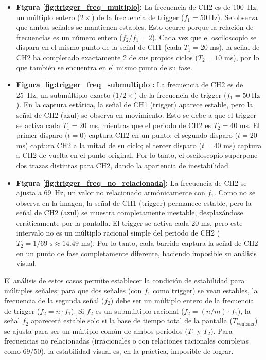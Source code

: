 \begin{itemize}
    \item \textbf{Figura \ref{fig:trigger_freq_multiplo}:} La frecuencia de CH2 es de \SI{100}{\hertz}, un múltiplo entero ($2 \times$) de la frecuencia de trigger ($f_1 = \SI{50}{\hertz}$). Se observa que ambas señales se mantienen estables. Esto ocurre porque la relación de frecuencias es un número entero ($f_2 / f_1 = 2$). Cada vez que el osciloscopio se dispara en el mismo punto de la señal de CH1 (cada $T_1 = 20$ ms), la señal de CH2 ha completado exactamente 2 de sus propios ciclos ($T_2 = 10$ ms), por lo que también se encuentra en el mismo punto de su fase.
    
    \item \textbf{Figura \ref{fig:trigger_freq_submultiplo}:} La frecuencia de CH2 es de \SI{25}{\hertz}, un submúltiplo exacto ($1/2 \times$) de la frecuencia de trigger ($f_1 = \SI{50}{\hertz}$). En la captura estática, la señal de CH1 (trigger) aparece estable, pero la señal de CH2 (azul) se observa en movimiento. Esto se debe a que el trigger se activa cada $T_1 = 20$ ms, mientras que el periodo de CH2 es $T_2 = 40$ ms. El primer disparo ($t=0$) captura CH2 en un punto; el segundo disparo ($t=20$ ms) captura CH2 a la mitad de su ciclo; el tercer disparo ($t=40$ ms) captura a CH2 de vuelta en el punto original. Por lo tanto, el osciloscopio superpone dos trazas distintas para CH2, dando la apariencia de inestabilidad.
    
    \item \textbf{Figura \ref{fig:trigger_freq_no_relacionada}:} La frecuencia de CH2 se ajusta a \SI{69}{\hertz}, un valor no relacionado armónicamente con $f_1$. Como no se observa en la imagen, la señal de CH1 (trigger) permanece estable, pero la señal de CH2 (azul) se muestra completamente inestable, desplazándose erráticamente por la pantalla. El trigger se activa cada 20 ms, pero este intervalo no es un múltiplo racional simple del periodo de CH2 ($T_2 = 1/69 \text{ s} \approx 14.49$ ms). Por lo tanto, cada barrido captura la señal de CH2 en un punto de fase completamente diferente, haciendo imposible su análisis visual.
\end{itemize}

El análisis de estos casos permite establecer la condición de estabilidad para múltiples señales: para que dos señales (con $f_1$ como trigger) se vean estables, la frecuencia de la segunda señal ($f_2$) debe ser un múltiplo entero de la frecuencia de trigger ($f_2 = n \cdot f_1$). Si $f_2$ es un submúltiplo racional ($f_2 = (n/m) \cdot f_1$), la señal $f_2$ aparecerá estable solo si la base de tiempo total de la pantalla ($T_{\text{ventana}}$) se ajusta para ser un múltiplo común de ambos períodos ($T_1$ y $T_2$). Para frecuencias no relacionadas (irracionales o con relaciones racionales complejas como 69/50), la estabilidad visual es, en la práctica, imposible de lograr.




